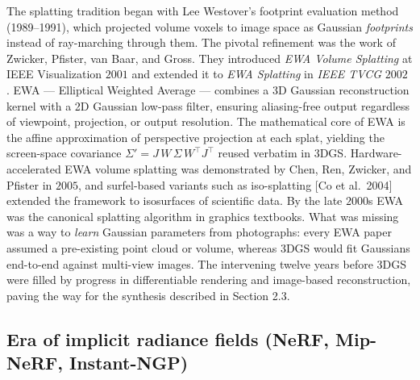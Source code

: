\documentclass{article}
\begin{document}
The splatting tradition began with Lee Westover's footprint evaluation method (1989--1991), which projected volume voxels to image space as Gaussian \emph{footprints} instead of ray-marching through them. The pivotal refinement was the work of Zwicker, Pfister, van Baar, and Gross. They introduced \emph{EWA Volume Splatting} at IEEE Visualization \(2001\) \cite{zwicker2001ewavolumesplatting} and extended it to \emph{EWA Splatting} in \emph{IEEE TVCG} \(2002\) \cite{zwicker2002ewasplatting}. EWA --- Elliptical Weighted Average --- combines a 3D Gaussian reconstruction kernel with a 2D Gaussian low-pass filter, ensuring aliasing-free output regardless of viewpoint, projection, or output resolution. The mathematical core of EWA is the affine approximation of perspective projection at each splat, yielding the screen-space covariance \(\Sigma'=J\,W\,\Sigma\,W^{\top}J^{\top}\) reused verbatim in 3DGS. Hardware-accelerated EWA volume splatting was demonstrated by Chen, Ren, Zwicker, and Pfister in \(2005\), and surfel-based variants such as iso-splatting {[}Co et al.~2004{]} extended the framework to isosurfaces of scientific data. By the late \(2000\)s EWA was the canonical splatting algorithm in graphics textbooks. What was missing was a way to \emph{learn} Gaussian parameters from photographs: every EWA paper assumed a pre-existing point cloud or volume, whereas 3DGS would fit Gaussians end-to-end against multi-view images. The intervening twelve years before 3DGS were filled by progress in differentiable rendering and image-based reconstruction, paving the way for the synthesis described in Section 2.3.

\subsection{Era of implicit radiance fields (NeRF, Mip-NeRF, Instant-NGP)}\label{era-of-implicit-radiance-fields-nerf-mip-nerf-instant-ngp}
\end{document}
